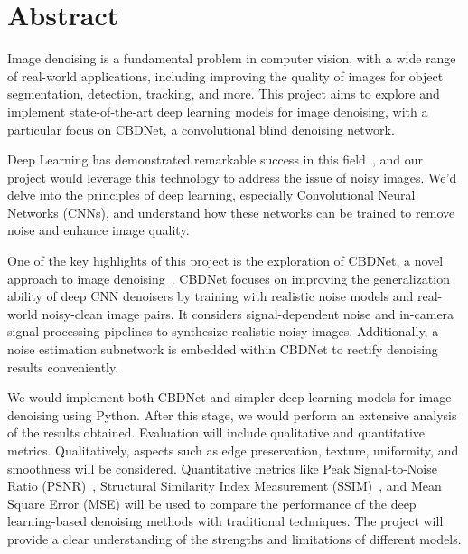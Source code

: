 
\section*{Abstract}\label{sec:abstract}

    Image denoising is a fundamental problem in computer vision, with a wide range of real-world applications,
    including improving the quality of images for object segmentation, detection, tracking, and more.
    This project aims to explore and implement state-of-the-art deep learning models for image denoising,
    with a particular focus on CBDNet, a convolutional blind denoising network.

    Deep Learning has demonstrated remarkable success in this field~\cite{9057895},
    and our project would leverage this technology to address the issue of noisy images.
    We’d delve into the principles of deep learning, especially Convolutional Neural Networks (CNNs),
    and understand how these networks can be trained to remove noise and enhance image quality.

    One of the key highlights of this project is the exploration of CBDNet, a novel approach to image denoising~\cite{guo2019convolutional}.
    CBDNet focuses on improving the generalization ability of deep CNN denoisers by training with realistic noise models and real-world noisy-clean image pairs.
    It considers signal-dependent noise and in-camera signal processing pipelines to synthesize realistic noisy images.
    Additionally, a noise estimation subnetwork is embedded within CBDNet to rectify denoising results conveniently.

    We would implement both CBDNet and simpler deep learning models for image denoising using Python.
    After this stage, we would perform an extensive analysis of the results obtained.
    Evaluation will include qualitative and quantitative metrics.
    Qualitatively, aspects such as edge preservation, texture, uniformity, and smoothness will be considered.
    Quantitative metrics like Peak Signal-to-Noise Ratio (PSNR)~\cite{NI_official_website_2023},
    Structural Similarity Index Measurement (SSIM)~\cite{1284395},
    and Mean Square Error (MSE) will be used to compare the performance of the deep learning-based denoising methods with traditional techniques.
    The project will provide a clear understanding of the strengths and limitations of different models.
